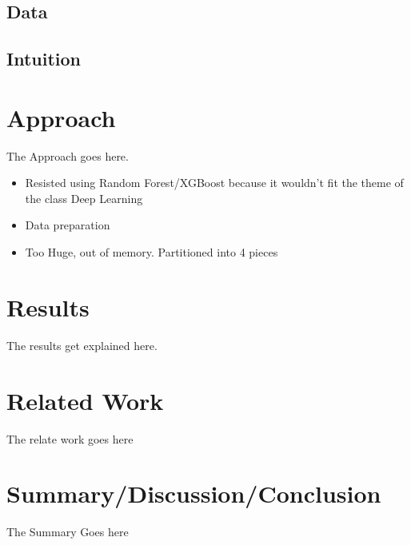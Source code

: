 \documentclass[10pt,twocolumn,letterpaper]{article}
\begin{document}
\subsection{Data}
\subsection{Intuition}





\section{Approach}
The Approach goes here.


\begin{itemize}
  \item Resisted using Random Forest/XGBoost because it wouldn’t fit the theme of the class Deep Learning
  \item Data preparation
  \item Too Huge, out of memory. Partitioned into 4 pieces

\end{itemize}



\section{Results}
The results get explained here.

\section{Related Work}
The relate work goes here

\section{Summary/Discussion/Conclusion}
The Summary Goes here
\end{document}
